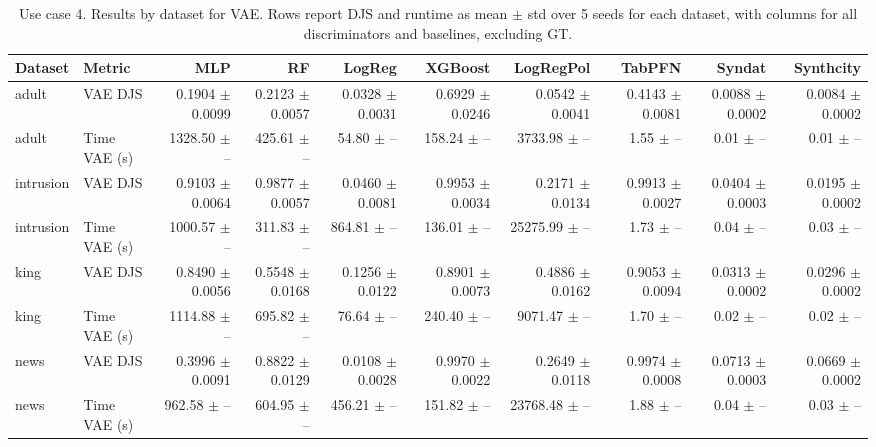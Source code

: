 \begin{table}[ht]
\centering
\small
\setlength{\tabcolsep}{3pt}
\caption{Use case 4. Results by dataset for VAE. Rows report DJS and runtime as mean $\pm$ std over 5 seeds for each dataset, with columns for all discriminators and baselines, excluding GT.}
\label{tab:uc4_vae_by_classifier_mean_std}
\begin{tabular}{llrrrrrrrr}
\toprule
Dataset & Metric & MLP & RF & LogReg & XGBoost & LogRegPol & TabPFN & Syndat & Synthcity \\
\midrule
adult & VAE DJS & 0.1904 $\pm$ 0.0099 & 0.2123 $\pm$ 0.0057 & 0.0328 $\pm$ 0.0031 & 0.6929 $\pm$ 0.0246 & 0.0542 $\pm$ 0.0041 & 0.4143 $\pm$ 0.0081 & 0.0088 $\pm$ 0.0002 & 0.0084 $\pm$ 0.0002 \\
adult & Time VAE (s) & 1328.50 $\pm$ -- & 425.61 $\pm$ -- & 54.80 $\pm$ -- & 158.24 $\pm$ -- & 3733.98 $\pm$ -- & 1.55 $\pm$ -- & 0.01 $\pm$ -- & 0.01 $\pm$ -- \\
intrusion & VAE DJS & 0.9103 $\pm$ 0.0064 & 0.9877 $\pm$ 0.0057 & 0.0460 $\pm$ 0.0081 & 0.9953 $\pm$ 0.0034 & 0.2171 $\pm$ 0.0134 & 0.9913 $\pm$ 0.0027 & 0.0404 $\pm$ 0.0003 & 0.0195 $\pm$ 0.0002 \\
intrusion & Time VAE (s) & 1000.57 $\pm$ -- & 311.83 $\pm$ -- & 864.81 $\pm$ -- & 136.01 $\pm$ -- & 25275.99 $\pm$ -- & 1.73 $\pm$ -- & 0.04 $\pm$ -- & 0.03 $\pm$ -- \\
king & VAE DJS & 0.8490 $\pm$ 0.0056 & 0.5548 $\pm$ 0.0168 & 0.1256 $\pm$ 0.0122 & 0.8901 $\pm$ 0.0073 & 0.4886 $\pm$ 0.0162 & 0.9053 $\pm$ 0.0094 & 0.0313 $\pm$ 0.0002 & 0.0296 $\pm$ 0.0002 \\
king & Time VAE (s) & 1114.88 $\pm$ -- & 695.82 $\pm$ -- & 76.64 $\pm$ -- & 240.40 $\pm$ -- & 9071.47 $\pm$ -- & 1.70 $\pm$ -- & 0.02 $\pm$ -- & 0.02 $\pm$ -- \\
news & VAE DJS & 0.3996 $\pm$ 0.0091 & 0.8822 $\pm$ 0.0129 & 0.0108 $\pm$ 0.0028 & 0.9970 $\pm$ 0.0022 & 0.2649 $\pm$ 0.0118 & 0.9974 $\pm$ 0.0008 & 0.0713 $\pm$ 0.0003 & 0.0669 $\pm$ 0.0002 \\
news & Time VAE (s) & 962.58 $\pm$ -- & 604.95 $\pm$ -- & 456.21 $\pm$ -- & 151.82 $\pm$ -- & 23768.48 $\pm$ -- & 1.88 $\pm$ -- & 0.04 $\pm$ -- & 0.03 $\pm$ -- \\
\bottomrule
\end{tabular}
\end{table}
